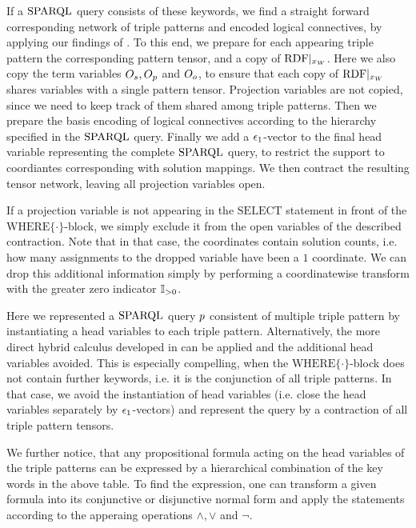 If a $\mathrm{SPARQL}$ query consists of these keywords, we find a straight forward corresponding network of triple patterns and encoded logical connectives, by applying our findings of .
To this end, we prepare for each appearing triple pattern the corresponding pattern tensor, and a copy of ${\mathrm{RDF}}|_{x_{W}}$.
Here we also copy the term variables $O_{s},O_{p}$ and $O_{o}$, to ensure that each copy of ${\mathrm{RDF}}|_{x_{W}}$ shares variables with a single pattern tensor.
Projection variables are not copied, since we need to keep track of them shared among triple patterns.
Then we prepare the basis encoding of logical connectives according to the hierarchy specified in the $\mathrm{SPARQL}$ query.
Finally we add a $\epsilon_1$-vector to the final head variable representing the complete $\mathrm{SPARQL}$ query, to restrict the support to coordiantes corresponding with solution mappings.
We then contract the resulting tensor network, leaving all projection variables open.

If a projection variable is not appearing in the $\mathrm{SELECT}$ statement in front of the $\mathrm{WHERE}\{\cdot\}$-block, we simply exclude it from the open variables of the described contraction.
Note that in that case, the coordinates contain solution counts, i.e. how many assignments to the dropped variable have been a $1$ coordinate.
We can drop this additional information simply by performing a coordinatewise transform with the greater zero indicator $\mathbb{I}_{>0}$.

Here we represented a $\mathrm{SPARQL}$ query $p$ consistent of multiple triple pattern by instantiating a head variables to each triple pattern.
Alternatively, the more direct hybrid calculus developed in  can be applied and the additional head variables avoided.
This is especially compelling, when the $\mathrm{WHERE}\{\cdot\}$-block does not contain further keywords, i.e. it is the conjunction of all triple patterns.
In that case, we avoid the instantiation of head variables (i.e. close the head variables separately by $\epsilon_1$-vectors) and represent the query by a contraction of all triple pattern tensors.

We further notice, that any propositional formula acting on the head variables of the triple patterns can be expressed by a hierarchical combination of the key words in the above table.
To find the expression, one can transform a given formula into its conjunctive or disjunctive normal form and apply the statements according to the apperaing operations $\land,\lor$ and $\lnot$.


